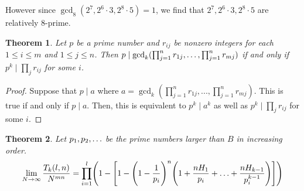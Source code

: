 \documentclass[10pt,a4paper]{article}
\newtheorem{theorem}{Theorem}[section]
\theoremstyle{definition}
\theoremstyle{remark}
\begin{document}
\noindent However since $\gcd_8(2^7, 2^6 \cdot 3, 2^8 \cdot 5) = 1$, we find that $2^7, 2^6 \cdot 3, 2^8 \cdot 5$ are relatively $8$-prime.

\begin{theorem} Let $p$ be a prime number and $r_{ij}$ be nonzero integers for each $1 \leq i \leq m$ and $1 \leq j \leq n$. Then
$p \mid \gcd_k(\prod_{j=1}^{n}r_{1j},\mathellipsis,\prod_{j=1}^n r_{mj})$ if and only if $p^k \mid \prod_{j}r_{ij}$ for some $i$.
\end{theorem}

\begin{proof}
Suppose that $p \mid a$ where $a = \gcd_k(\prod_{j=1}^n r_{1j}, ...,\prod_{j=1}^n r_{mj})$. This is true if and only if $p \mid a$. Then, this is equivalent to $p^k \mid a^k$ as well as $p^k \mid \prod_j r_{ij}$ for some $i$.
\end{proof}
 
	\begin{theorem}
		Let \(p_1, p_2,\mathellipsis\) be the prime numbers larger than \(B\) in increasing order.
		\begin{equation}
			\lim\limits_{N\to\infty} \frac{T_k(l,n)}{N^{mn}}=\prod_{i=1}^l\Biggl(1-\Biggl[1-\Biggl(1-\frac{1}{p_i}\Biggr)^n\Biggl(1+\frac{nH_1}{p_i}+\mathellipsis+\frac{nH_{k-1}}{p_i^{k-1}}\Biggr)\Biggr]\Biggr)
		\end{equation}
	\end{theorem}
\end{document}
